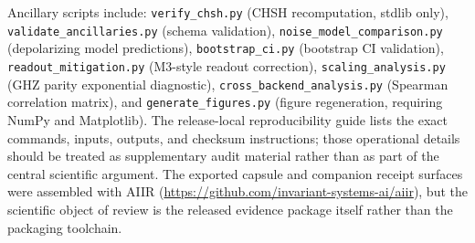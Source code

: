 \documentclass[aps,prxquantum,twocolumn,superscriptaddress,amsmath,amssymb,longbibliography,floatfix]{revtex4-2}
\begin{document}
Ancillary scripts include: \texttt{verify\_chsh.py} (CHSH recomputation, stdlib only), \texttt{validate\_ancillaries.py} (schema validation), \texttt{noise\_model\_comparison.py} (depolarizing model predictions), \texttt{bootstrap\_ci.py} (bootstrap CI validation), \texttt{readout\_mitigation.py} (M3-style readout correction), \texttt{scaling\_analysis.py} (GHZ parity exponential diagnostic), \texttt{cross\_backend\_analysis.py} (Spearman correlation matrix), and \texttt{generate\_figures.py} (figure regeneration, requiring NumPy and Matplotlib). The release-local reproducibility guide lists the exact commands, inputs, outputs, and checksum instructions; those operational details should be treated as supplementary audit material rather than as part of the central scientific argument. The exported capsule and companion receipt surfaces were assembled with AIIR (\url{https://github.com/invariant-systems-ai/aiir}), but the scientific object of review is the released evidence package itself rather than the packaging toolchain.


\end{document}
